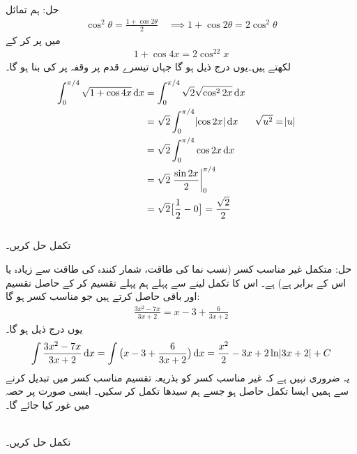 حل:\quad
ہم تماثل
\begin{align*}
\cos^2\theta=\frac{1+\cos 2\theta}{2}\quad \implies 1+\cos 2\theta=2\cos^2\theta
\end{align*}
میں  پر کر کے 
\begin{align*}
1+\cos 4x=2\cos^22x
\end{align*}
لکھتے ہیں۔یوں درج ذیل ہو گا جہاں تیسرے قدم پر وقفہ  پر  کی بنا  ہو گا۔
\begin{align*}
\int_0^{\pi/4}\sqrt{1+\cos 4x}\dif x&=\int_0^{\pi/4}\sqrt{2}\sqrt{\cos^22x}\dif x\\
&=\sqrt{2}\int_0^{\pi/4}\abs{\cos 2x}\dif x&&\sqrt{u^2}=\abs{u}\\
&=\sqrt{2}\int_0^{\pi/4}\cos 2x\dif x\\
&=\sqrt{2}\left.\frac{\sin 2x}{2}\right\vert_0^{\pi/4}\\
&=\sqrt{2}\big[\frac{1}{2}-0\big]=\frac{\sqrt{2}}{2}
\end{align*}
\\
تکمل  حل کریں۔

حل:\quad 
متکمل غیر مناسب کسر (نسب نما کی طاقت، شمار کنندہ کی طاقت سے زیادہ یا اس کے برابر ہے)  ہے۔ اس کا تکمل لینے سے پہلے ہم پہلے تقسیم کر کے حاصل تقسیم اور باقی حاصل کرتے ہیں جو مناسب کسر ہو گا:
\begin{align*}
\frac{3x^2-7x}{3x+2}=x-3+\frac{6}{3x+2}
\end{align*}
یوں درج ذیل ہو گا۔
\begin{align*}
\int\frac{3x^2-7x}{3x+2}\dif x=\int\big(x-3+\frac{6}{3x+2}\big)\dif x=\frac{x^2}{2}-3x+2\ln\abs{3x+2}+C
\end{align*}
یہ ضروری نہیں ہے کہ غیر مناسب کسر کو بذریعہ تقسیم مناسب  کسر میں تبدیل کرنے سے  ہمیں ایسا تکمل حاصل ہو جسے ہم سیدھا تکمل کر سکیں۔ ایسی صورت پر حصہ   میں غور کیا جائے گا۔

\\
تکمل  حل کریں۔

